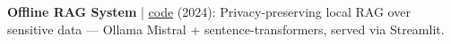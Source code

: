 \item \textbf{Offline RAG System} | \href{https://github.com/Rontor3}{code} (2024): Privacy-preserving local RAG over sensitive data --- Ollama Mistral + sentence-transformers, served via Streamlit.
